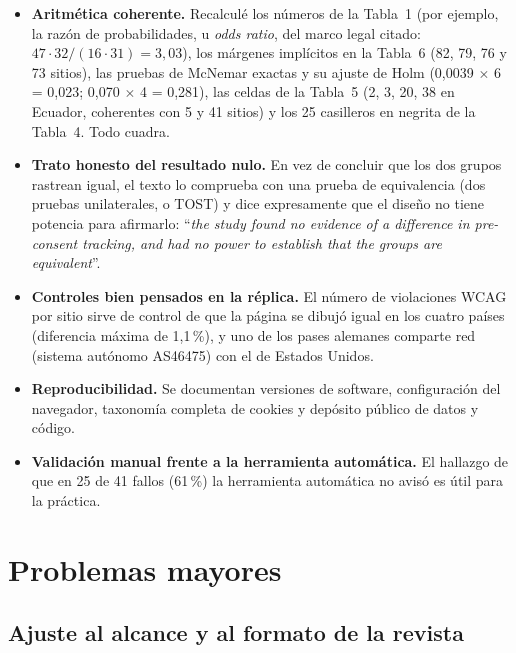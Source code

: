\documentclass[11pt,a4paper]{article}
\newcommand{\cita}[1]{``\textit{#1}''}
\begin{document}
\begin{itemize}
	\item \textbf{Aritm\'etica coherente.} Recalcul\'e los n\'umeros de la Tabla~1 (por ejemplo, la raz\'on de probabilidades, u \emph{odds ratio}, del marco legal citado: $47\cdot32/(16\cdot31)=3{,}03$), los m\'argenes impl\'icitos en la Tabla~6 (82, 79, 76 y 73 sitios), las pruebas de McNemar exactas y su ajuste de Holm (0{,}0039 $\times$ 6 = 0{,}023; 0{,}070 $\times$ 4 = 0{,}281), las celdas de la Tabla~5 (2, 3, 20, 38 en Ecuador, coherentes con 5 y 41 sitios) y los 25 casilleros en negrita de la Tabla~4. Todo cuadra.
	\item \textbf{Trato honesto del resultado nulo.} En vez de concluir que los dos grupos rastrean igual, el texto lo comprueba con una prueba de equivalencia (dos pruebas unilaterales, o TOST) y dice expresamente que el dise\~no no tiene potencia para afirmarlo: \cita{the study found no evidence of a difference in pre-consent tracking, and had no power to establish that the groups are equivalent}.
	\item \textbf{Controles bien pensados en la r\'eplica.} El n\'umero de violaciones WCAG por sitio sirve de control de que la p\'agina se dibuj\'o igual en los cuatro pa\'ises (diferencia m\'axima de 1{,}1\,\%), y uno de los pases alemanes comparte red (sistema aut\'onomo AS46475) con el de Estados Unidos.
	\item \textbf{Reproducibilidad.} Se documentan versiones de software, configuraci\'on del navegador, taxonom\'ia completa de cookies y dep\'osito p\'ublico de datos y c\'odigo.
	\item \textbf{Validaci\'on manual frente a la herramienta autom\'atica.} El hallazgo de que en 25 de 41 fallos (61\,\%) la herramienta autom\'atica no avis\'o es \'util para la pr\'actica.
\end{itemize}

\section{Problemas mayores}

\subsection{Ajuste al alcance y al formato de la revista}\label{sec:ajuste}
\end{document}
